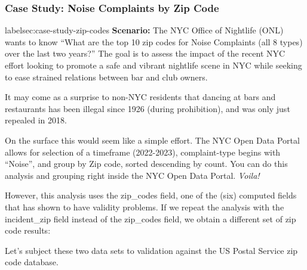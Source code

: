 \documentclass[12pt, titlepage]{article}
\begin{document}
		\subsubsection{Case Study: Noise Complaints by Zip Code}
		{label{sec:case-study-zip-codes}
		\textbf{Scenario:} The NYC Office of Nightlife (ONL) wants to 
		know ``What are the top 10 zip codes for Noise Complaints (all 8 types) 
		over the last two years?'' The goal is to assess the impact of the 
		recent NYC effort looking to promote a safe and vibrant 
		nightlife scene in NYC while seeking to ease strained 
		relations between bar and club owners. 
		
		It may come as a surprise to non-NYC residents that dancing at 
		bars and restaurants has been illegal since 1926 (during prohibition), 
		and was only just repealed in 2018. 
		
		On the surface this would seem like a simple effort.  The NYC Open 
		Data Portal allows for selection of a timeframe (2022-2023), 
		complaint-type begins with ``Noise'', and group by Zip code, 
		sorted descending by count. You can do this analysis and 
		grouping right inside the NYC Open Data Portal. \textit{Voila!}

		However, this analysis uses the zip\_codes field, one of the (six) 
		computed fields that has shown to have validity problems. 
		If we repeat the analysis with the incident\_zip field instead 
		of the zip\_codes field, we obtain a different set of zip code results:
		
		Let's subject these two data sets to validation against 
		the US Postal Service zip code database.
	 
}
\end{document}
